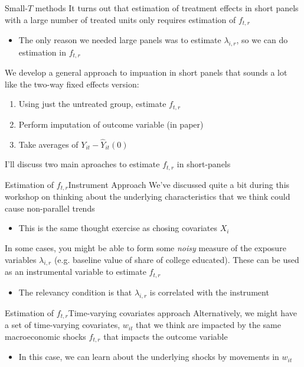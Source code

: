\documentclass[t]{beamer}
\begin{document}
\begin{frame}{Small-$T$ methods}
  It turns out that estimation of treatment effects in short panels with a large number of treated units only requires estimation of $f_{t,r}$
  \begin{itemize}
    \item The only reason we needed large panels was to estimate $\lambda_{i, r}$, so we can do estimation in $f_{t,r}$
  \end{itemize}

  \pause
  \bigskip
  We develop a general approach to impuation in short panels that sounds a lot like the two-way fixed effects version:
  \begin{enumerate}
    \item Using just the untreated group, estimate $f_{t,r}$
    \item Perform imputation of outcome variable (in paper)
    \item Take averages of $Y_{it} - \hat{Y}_{it}(0)$
  \end{enumerate}

  I'll discuss two main aproaches to estimate $f_{t,r}$ in short-panels
\end{frame}

\begin{frame}{Estimation of $f_{t,r}$}{Instrument Approach}
  We've discussed quite a bit during this workshop on thinking about the underlying characteristics that we think could cause non-parallel trends
  \begin{itemize}
    \item This is the same thought exercise as chosing covariates $X_i$
  \end{itemize}

  \pause
  \bigskip
  In some cases, you might be able to form some \emph{noisy} measure of the exposure variables $\lambda_{i,r}$ (e.g. baseline value of share of college educated). These can be used as an instrumental variable to estimate $f_{t,r}$ 
  \begin{itemize}
    \item The relevancy condition is that $\lambda_{i,r}$ is correlated with the instrument
  \end{itemize}
\end{frame}

\begin{frame}{Estimation of $f_{t,r}$}{Time-varying covariates approach}
  Alternatively, we might have a set of time-varying covariates, $w_{it}$ that we think are impacted by the same macroeconomic shocks $f_{t,r}$ that impacts the outcome variable

  \begin{itemize}
    \item In this case, we can learn about the underlying shocks by movements in $w_{it}$
  \end{itemize}
\end{frame}
\end{document}
